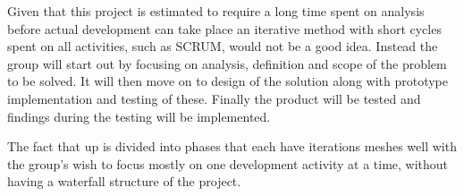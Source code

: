 Given that this project is estimated to require a long time spent on analysis before actual development can take place an iterative method with short cycles spent on all activities, such as SCRUM, would not be a good idea. Instead the group will start out by focusing on analysis, definition and scope of the problem to be solved. It will then move on to design of the solution along with prototype implementation and testing of these. Finally the product will be tested and findings during the testing will be implemented. 

The fact that \ac{up} is divided into phases that each have iterations meshes well with the group's wish to focus mostly on one development activity at a time, without having a waterfall structure of the project.